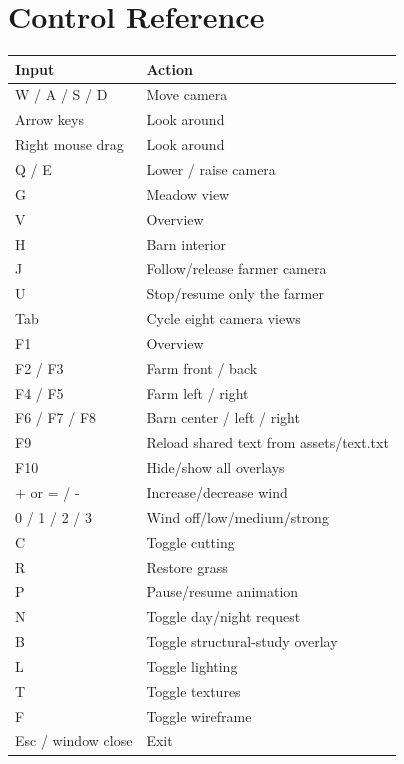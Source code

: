 \documentclass[11pt,a4paper,openany]{book}
\begin{document}
\chapter{Control Reference}
\begin{longtable}{@{}ll@{}}
	\toprule
	Input              & Action                                  \\
	\midrule
	\endhead
	W / A / S / D      & Move camera                             \\
	Arrow keys         & Look around                             \\
	Right mouse drag   & Look around                             \\
	Q / E              & Lower / raise camera                    \\
	G                  & Meadow view                             \\
	V                  & Overview                                \\
	H                  & Barn interior                           \\
	J                  & Follow/release farmer camera             \\
	U                  & Stop/resume only the farmer              \\
	Tab                & Cycle eight camera views                \\
	F1                 & Overview                                \\
	F2 / F3            & Farm front / back                       \\
	F4 / F5            & Farm left / right                       \\
	F6 / F7 / F8       & Barn center / left / right              \\
	F9                 & Reload shared text from assets/text.txt \\
	F10                & Hide/show all overlays                  \\
	+ or = / -         & Increase/decrease wind                  \\
	0 / 1 / 2 / 3      & Wind off/low/medium/strong              \\
	C                  & Toggle cutting                          \\
	R                  & Restore grass                           \\
	P                  & Pause/resume animation                  \\
	N                  & Toggle day/night request                \\
	B                  & Toggle structural-study overlay         \\
	L                  & Toggle lighting                         \\
	T                  & Toggle textures                         \\
	F                  & Toggle wireframe                        \\
	Esc / window close & Exit                                    \\
	\bottomrule
\end{longtable}
\end{document}
